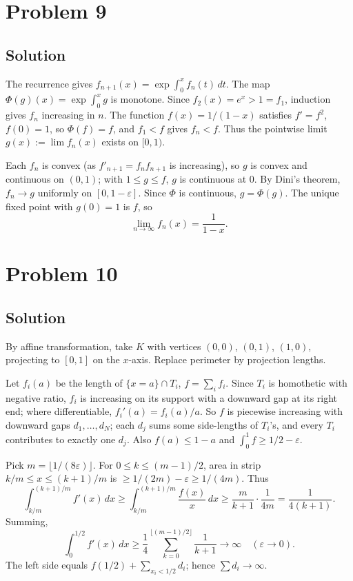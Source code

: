 \documentclass{article}
\begin{document}
\section*{Problem 9}
\subsection*{Solution}
The recurrence gives $f_{n+1}(x) = \exp\int_0^x f_n(t)\,dt$. The map $\Phi(g)(x) = \exp\int_0^x g$ is monotone. Since $f_2(x) = e^x > 1 = f_1$, induction gives $f_n$ increasing in $n$. The function $f(x) = 1/(1-x)$ satisfies $f' = f^2$, $f(0)=1$, so $\Phi(f) = f$, and $f_1 < f$ gives $f_n < f$. Thus the pointwise limit $g(x) := \lim f_n(x)$ exists on $[0,1)$.

Each $f_n$ is convex (as $f'_{n+1} = f_n f_{n+1}$ is increasing), so $g$ is convex and continuous on $(0,1)$; with $1 \le g \le f$, $g$ is continuous at $0$. By Dini's theorem, $f_n \to g$ uniformly on $[0, 1-\varepsilon]$. Since $\Phi$ is continuous, $g = \Phi(g)$. The unique fixed point with $g(0) = 1$ is $f$, so
\[ \lim_{n \to \infty} f_n(x) = \frac{1}{1-x}. \]

\section*{Problem 10}
\subsection*{Solution}
By affine transformation, take $K$ with vertices $(0,0)$, $(0,1)$, $(1,0)$, projecting to $[0,1]$ on the $x$-axis. Replace perimeter by projection lengths.

Let $f_i(a)$ be the length of $\{x = a\} \cap T_i$, $f = \sum_i f_i$. Since $T_i$ is homothetic with negative ratio, $f_i$ is increasing on its support with a downward gap at its right end; where differentiable, $f_i'(a) = f_i(a)/a$. So $f$ is piecewise increasing with downward gaps $d_1, \dots, d_N$; each $d_j$ sums some side-lengths of $T_i$'s, and every $T_i$ contributes to exactly one $d_j$. Also $f(a) \le 1-a$ and $\int_0^1 f \ge 1/2 - \varepsilon$.

Pick $m = \lfloor 1/(8\varepsilon) \rfloor$. For $0 \le k \le (m-1)/2$, area in strip $k/m \le x \le (k+1)/m$ is $\ge 1/(2m) - \varepsilon \ge 1/(4m)$. Thus
\[ \int_{k/m}^{(k+1)/m} f'(x)\,dx \ge \int_{k/m}^{(k+1)/m} \frac{f(x)}{x}\,dx \ge \frac{m}{k+1}\cdot\frac{1}{4m} = \frac{1}{4(k+1)}. \]
Summing,
\[ \int_0^{1/2} f'(x)\,dx \ge \frac{1}{4}\sum_{k=0}^{\lfloor (m-1)/2\rfloor} \frac{1}{k+1} \to \infty \quad (\varepsilon \to 0). \]
The left side equals $f(1/2) + \sum_{x_i < 1/2} d_i$; hence $\sum d_i \to \infty$.
\end{document}
